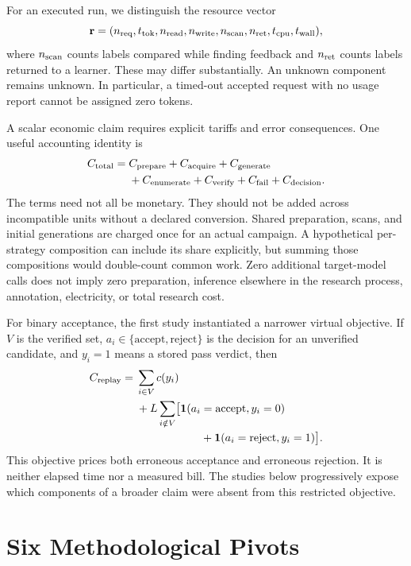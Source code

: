 \documentclass[10pt,twocolumn,letterpaper]{article}
\begin{document}
For an executed run, we distinguish the resource vector
\begin{equation}
\mathbf r=(n_{\rm req},t_{\rm tok},n_{\rm read},n_{\rm write},n_{\rm scan},n_{\rm ret},t_{\rm cpu},t_{\rm wall}),
\label{eq:resources}
\end{equation}
where $n_{\rm scan}$ counts labels compared while finding feedback and $n_{\rm ret}$ counts labels returned to a learner. These may differ substantially. An unknown component remains unknown. In particular, a timed-out accepted request with no usage report cannot be assigned zero tokens.

A scalar economic claim requires explicit tariffs and error consequences. One useful accounting identity is
\begin{align}
C_{\rm total}={}&C_{\rm prepare}+C_{\rm acquire}+C_{\rm generate}\nonumber\\
 &+C_{\rm enumerate}+C_{\rm verify}+C_{\rm fail}+C_{\rm decision}.
\label{eq:total}
\end{align}
The terms need not all be monetary. They should not be added across incompatible units without a declared conversion. Shared preparation, scans, and initial generations are charged once for an actual campaign. A hypothetical per-strategy composition can include its share explicitly, but summing those compositions would double-count common work. Zero additional target-model calls does not imply zero preparation, inference elsewhere in the research process, annotation, electricity, or total research cost.

For binary acceptance, the first study instantiated a narrower virtual objective. If $V$ is the verified set, $a_i\in\{\text{accept},\text{reject}\}$ is the decision for an unverified candidate, and $y_i=1$ means a stored pass verdict, then
\begin{align}
C_{\rm replay}={}&\sum_{i\in V}c(y_i)\nonumber\\
 &+L\sum_{i\notin V}\bigl[\mathbf1(a_i=\text{accept},y_i=0)\nonumber\\
 &\hspace{58pt}+\mathbf1(a_i=\text{reject},y_i=1)\bigr].
\label{eq:virtual}
\end{align}
This objective prices both erroneous acceptance and erroneous rejection. It is neither elapsed time nor a measured bill. The studies below progressively expose which components of a broader claim were absent from this restricted objective.

\section{Six Methodological Pivots}
\label{sec:pivots}
\end{document}
